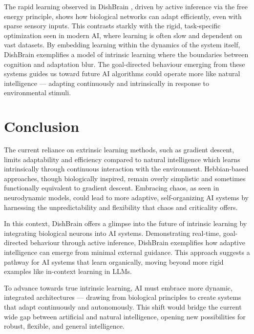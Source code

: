 \documentclass{article}
\begin{document}
The rapid learning observed in DishBrain \cite{Habibollahi2022}, driven
by active inference via the free energy principle, shows how biological
networks can adapt efficiently, even with sparse sensory inputs. This
contrasts starkly with the rigid, task-specific optimization seen in
modern AI, where learning is often slow and dependent on vast datasets. By
embedding learning within the dynamics of the system itself, DishBrain
exemplifies a model of intrinsic learning where the boundaries between
cognition and adaptation blur. The goal-directed behaviour emerging from
these systems guides us toward future AI algorithms could operate more
like natural intelligence --- adapting continuously and intrinsically
in response to environmental stimuli.


\section{Conclusion}

The current reliance on extrinsic learning methods, such as gradient
descent, limits adaptability and efficiency compared to natural
intelligence which learns intrinsically through continuous interaction
with the environment. Hebbian-based approaches, though biologically
inspired, remain overly simplistic and sometimes functionally equivalent
to gradient descent. Embracing chaos, as seen in neurodynamic models,
could lead to more adaptive, self-organizing AI systems by harnessing
the unpredictability and flexibility that chaos and criticality offers.

In this context, DishBrain offers a glimpse into the future of intrinsic
learning by integrating biological neurons into AI systems. Demonstrating
real-time, goal-directed behaviour through active inference, DishBrain
exemplifies how adaptive intelligence can emerge from minimal external
guidance. This approach suggests a pathway for AI systems that learn
organically, moving beyond more rigid examples like in-context learning
in LLMs.

To advance towards true intrinsic learning, AI must embrace more dynamic,
integrated architectures --- drawing from biological principles to
create systems that adapt continuously and autonomously. This shift would
bridge the current wide gap between artificial and natural intelligence,
opening new possibilities for robust, flexible, and general intelligence.





\end{document}
